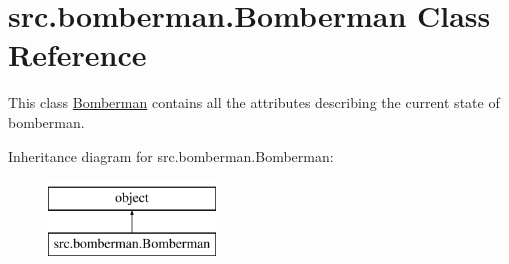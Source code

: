 \hypertarget{classsrc_1_1bomberman_1_1_bomberman}{}\section{src.\+bomberman.\+Bomberman Class Reference}
\label{classsrc_1_1bomberman_1_1_bomberman}


This class \hyperlink{classsrc_1_1bomberman_1_1_bomberman}{Bomberman} contains all the attributes describing the current state of bomberman.  


Inheritance diagram for src.\+bomberman.\+Bomberman\+:\begin{figure}[H]
\begin{center}
\leavevmode
\includegraphics[height=2.000000cm]{classsrc_1_1bomberman_1_1_bomberman}
\end{center}
\end{figure}
